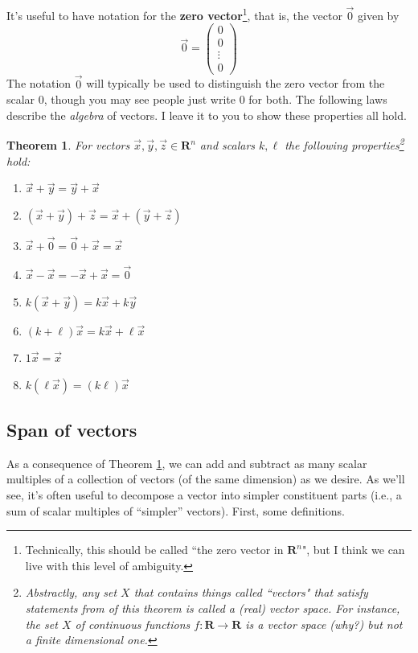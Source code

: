 \documentclass[12pt]{article}
\numberwithin{equation}{subsection}
\numberwithin{figure}{subsection}
\newtheorem{thm}[subsection]{Theorem}
\theoremstyle{note}
\begin{document}
It's useful to have notation for the \textbf{zero vector}\footnote{Technically, this should be called ``the zero vector in $\mathbf{R}^n$", but I think we can live with this level of ambiguity.}, that is, the vector $\vec{0}$ given by \begin{equation} \vec{0}=\begin{pmatrix} 0 \\ 0 \\ \vdots \\ 0 \end{pmatrix} \end{equation}
The notation $\vec{0}$ will typically be used to distinguish the zero vector from the scalar $0$, though you may see people just write $0$ for both. The following laws describe the \textit{algebra} of vectors. I leave it to you to show these properties all hold. 
\begin{thm}\label{thm-alg-of-vec}
For vectors $\vec{x}, \vec{y}, \vec{z} \in \mathbf{R}^n$ and scalars $k, \ell$ the following properties\footnote{Abstractly, any set $X$ that contains things called ``vectors" that satisfy statements from of this theorem is called a (real) \textit{vector space}. For instance, the set $X$ of continuous functions $f\colon \mathbf{R}\to\mathbf{R}$ is a vector space (why?) but not a finite dimensional one.} hold:
\begin{enumerate}[label=(\roman*)]
	\item $\vec{x}+\vec{y}=\vec{y}+\vec{x}$
	\item $(\vec{x}+\vec{y})+\vec{z}= \vec{x}+(\vec{y}+\vec{z})$
	\item $\vec{x}+\vec{0}=\vec{0}+\vec{x}=\vec{x}$
	\item $\vec{x}-\vec{x}=-\vec{x}+\vec{x}=\vec{0}$
	\item $k(\vec{x}+\vec{y})=k\vec{x}+k\vec{y}$
	\item $(k+\ell)\vec{x}=k\vec{x}+\ell\vec{x}$
	\item $1\vec{x}=\vec{x}$
	\item $k(\ell \vec{x})=(k\ell) \vec{x}$
\end{enumerate}

\end{thm}
\subsection{Span of vectors}
As a consequence of Theorem \ref{thm-alg-of-vec}, we can add and subtract as many scalar multiples of a collection of vectors (of the same dimension) as we desire. As we'll see, it's often useful to decompose a vector into simpler constituent parts (i.e., a sum of scalar multiples of ``simpler'' vectors). First, some definitions. 
\end{document}
